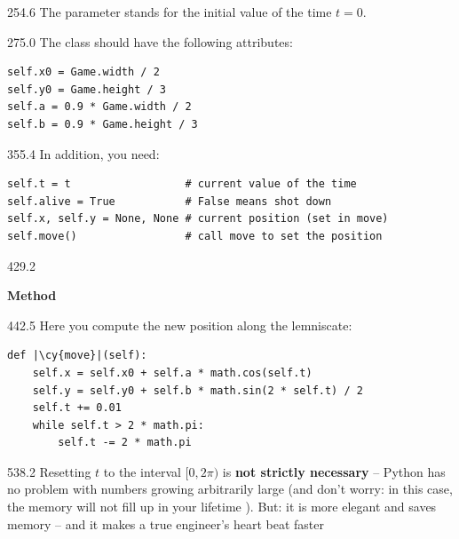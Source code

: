 \documentclass{aslab}
\newcommand*\codemd[1]{{\mdseries\codearg{#1}}}
\newcommand*\cy[1]{\textcolor{codecyan}{#1}}
\begin{document}
\begin{region}[x=74.7,right=0]{254.6}
The parameter  stands for the initial value of the time $t=0$.
\end{region}

\begin{region}[x=74.7,right=0,pitch=13.45]{275.0}
The class should have the following attributes:
\begin{lstlisting}[style=plain]
self.x0 = Game.width / 2
self.y0 = Game.height / 3
self.a = 0.9 * Game.width / 2
self.b = 0.9 * Game.height / 3
\end{lstlisting}
\end{region}

\begin{region}[x=74.7,right=0,pitch=13.35]{355.4}
In addition, you need:
\begin{lstlisting}[style=plain]
self.t = t                  # current value of the time
self.alive = True           # False means shot down
self.x, self.y = None, None # current position (set in move)
self.move()                 # call move to set the position
\end{lstlisting}
\end{region}

\begin{region}{429.2}
\begin{alist}[start=2,label={\bfseries(\Alph*)}]
\item \textbf{Method \codemd{move(self)}}
\end{alist}
\end{region}

\begin{region}[x=74.7,right=0,pitch=13.25]{442.5}
Here you compute the new position along the lemniscate:
\begin{lstlisting}[style=py]
def |\cy{move}|(self):
    self.x = self.x0 + self.a * math.cos(self.t)
    self.y = self.y0 + self.b * math.sin(2 * self.t) / 2
    self.t += 0.01
    while self.t > 2 * math.pi:
        self.t -= 2 * math.pi
\end{lstlisting}
\end{region}

\begin{region}[x=74.7,right=0,pitch=17.2]{538.2}
Resetting $t$ to the interval $[0,2\pi)$ is \textbf{not strictly necessary} --
Python has no problem with numbers growing arbitrarily large (and don't worry:
in this case, the memory will not fill up in your lifetime ).
But: it is more elegant and saves memory -- and it makes a true engineer's
heart beat faster 
\end{region}
\end{document}
